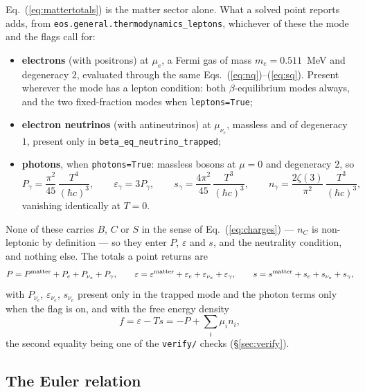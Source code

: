 \documentclass[aps,prc,onecolumn,superscriptaddress,nofootinbib,10pt]{revtex4-2}
\newcommand{\nC}{n_C}
\newcommand{\munue}{\mu_{\nu_e}}
\newcommand{\hc}{(\hbar c)^3}
\begin{document}
Eq.~(\ref{eq:mattertotals}) is the matter sector alone. What a solved point
reports adds, from \texttt{eos.general.thermodynamics\_leptons}, whichever of
these the mode and the flags call for:
%
\begin{itemize}
\item \textbf{electrons} (with positrons) at $\mu_e$, a Fermi gas of mass
      $m_e = 0.511$~MeV and degeneracy $2$, evaluated through the same
      Eqs.~(\ref{eq:nq})--(\ref{eq:sq}). Present wherever the mode has a
      lepton condition: both $\beta$-equilibrium modes always, and the two
      fixed-fraction modes when \texttt{leptons=True};
\item \textbf{electron neutrinos} (with antineutrinos) at $\munue$, massless
      and of degeneracy $1$, present only in
      \texttt{beta\_eq\_neutrino\_trapped};
\item \textbf{photons}, when \texttt{photons=True}: massless bosons at
      $\mu = 0$ and degeneracy $2$, so
      \begin{equation}
      P_\gamma = \frac{\pi^2}{45}\, \frac{T^4}{\hc} ,\qquad
      \varepsilon_\gamma = 3 P_\gamma ,\qquad
      s_\gamma = \frac{4\pi^2}{45}\, \frac{T^3}{\hc} ,\qquad
      n_\gamma = \frac{2\zeta(3)}{\pi^2}\, \frac{T^3}{\hc} ,
      \label{eq:photons}
      \end{equation}
      vanishing identically at $T = 0$.
\end{itemize}
%
None of these carries $B$, $C$ or $S$ in the sense of
Eq.~(\ref{eq:charges}) --- $\nC$ is non-leptonic by definition --- so they
enter $P$, $\varepsilon$ and $s$, and the neutrality condition, and nothing
else. The totals a point returns are
%
\begin{equation}
P = P^{\rm matter} + P_e + P_{\nu_e} + P_\gamma , \qquad
\varepsilon = \varepsilon^{\rm matter} + \varepsilon_e
              + \varepsilon_{\nu_e} + \varepsilon_\gamma , \qquad
s = s^{\rm matter} + s_e + s_{\nu_e} + s_\gamma ,
\label{eq:grandtotals}
\end{equation}
%
with $P_{\nu_e}$, $\varepsilon_{\nu_e}$, $s_{\nu_e}$ present only in the
trapped mode and the photon terms only when the flag is on, and with the free
energy density
%
\begin{equation}
f = \varepsilon - T s = -P + \sum_i \mu_i n_i ,
\end{equation}
%
the second equality being one of the \texttt{verify/} checks
(\S\ref{sec:verify}).

\subsection{The Euler relation}
\label{sec:euler}
\end{document}
